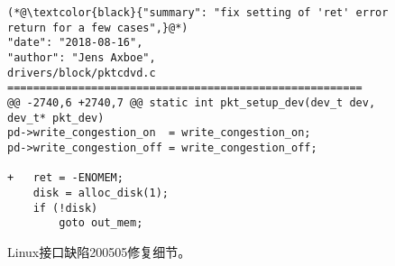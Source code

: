 \begin{figure}[b]
	\centering
	\begin{lstlisting}
(*@\textcolor{black}{"summary": "fix setting of 'ret' error return for a few cases",}@*)
"date": "2018-08-16",
"author": "Jens Axboe",
drivers/block/pktcdvd.c
=======================================================
@@ -2740,6 +2740,7 @@ static int pkt_setup_dev(dev_t dev, dev_t* pkt_dev)
pd->write_congestion_on  = write_congestion_on;
pd->write_congestion_off = write_congestion_off;

+	ret = -ENOMEM;
	disk = alloc_disk(1);
	if (!disk)
		goto out_mem;
	\end{lstlisting}
	\caption{
		Linux接口缺陷200505修复细节。
	}
	\label{fig:4-4-linux-example-fix}
\end{figure}